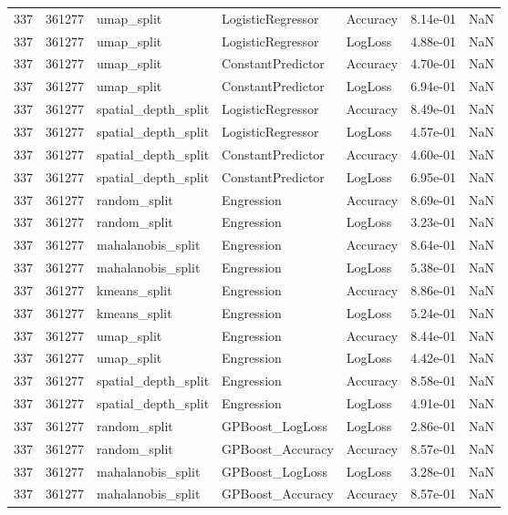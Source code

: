 \begin{tabular}{rrlllrr}
337 & 361277 & umap\_split & LogisticRegressor & Accuracy & 8.14e-01 & NaN \\
337 & 361277 & umap\_split & LogisticRegressor & LogLoss & 4.88e-01 & NaN \\
337 & 361277 & umap\_split & ConstantPredictor & Accuracy & 4.70e-01 & NaN \\
337 & 361277 & umap\_split & ConstantPredictor & LogLoss & 6.94e-01 & NaN \\
337 & 361277 & spatial\_depth\_split & LogisticRegressor & Accuracy & 8.49e-01 & NaN \\
337 & 361277 & spatial\_depth\_split & LogisticRegressor & LogLoss & 4.57e-01 & NaN \\
337 & 361277 & spatial\_depth\_split & ConstantPredictor & Accuracy & 4.60e-01 & NaN \\
337 & 361277 & spatial\_depth\_split & ConstantPredictor & LogLoss & 6.95e-01 & NaN \\
337 & 361277 & random\_split & Engression & Accuracy & 8.69e-01 & NaN \\
337 & 361277 & random\_split & Engression & LogLoss & 3.23e-01 & NaN \\
337 & 361277 & mahalanobis\_split & Engression & Accuracy & 8.64e-01 & NaN \\
337 & 361277 & mahalanobis\_split & Engression & LogLoss & 5.38e-01 & NaN \\
337 & 361277 & kmeans\_split & Engression & Accuracy & 8.86e-01 & NaN \\
337 & 361277 & kmeans\_split & Engression & LogLoss & 5.24e-01 & NaN \\
337 & 361277 & umap\_split & Engression & Accuracy & 8.44e-01 & NaN \\
337 & 361277 & umap\_split & Engression & LogLoss & 4.42e-01 & NaN \\
337 & 361277 & spatial\_depth\_split & Engression & Accuracy & 8.58e-01 & NaN \\
337 & 361277 & spatial\_depth\_split & Engression & LogLoss & 4.91e-01 & NaN \\
337 & 361277 & random\_split & GPBoost\_LogLoss & LogLoss & 2.86e-01 & NaN \\
337 & 361277 & random\_split & GPBoost\_Accuracy & Accuracy & 8.57e-01 & NaN \\
337 & 361277 & mahalanobis\_split & GPBoost\_LogLoss & LogLoss & 3.28e-01 & NaN \\
337 & 361277 & mahalanobis\_split & GPBoost\_Accuracy & Accuracy & 8.57e-01 & NaN \\

\end{tabular}
